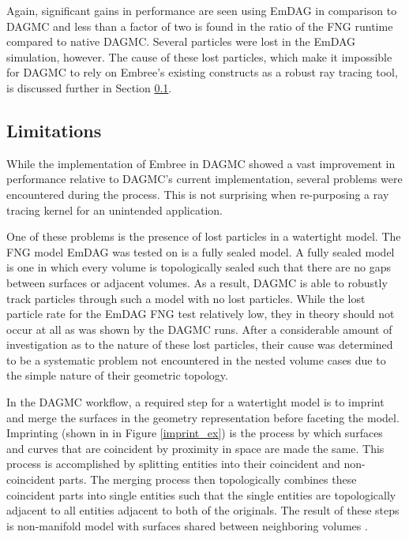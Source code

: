Again, significant gains in performance are seen using EmDAG in comparison to
DAGMC and less than a factor of two is found in the ratio of the FNG runtime
compared to native DAGMC. Several particles were lost in the EmDAG simulation,
however. The cause of these lost particles, which make it impossible for DAGMC
to rely on Embree's existing constructs as a robust ray tracing tool, is
discussed further in Section \ref{sec:emdag_limitations}.

\subsection{Limitations}\label{sec:emdag_limitations}

While the implementation of Embree in DAGMC showed a vast improvement in
performance relative to DAGMC's current implementation, several problems were
encountered during the process. This is not surprising when re-purposing a ray
tracing kernel for an unintended application.

One of these problems is the presence of lost particles in a watertight
model. The FNG model EmDAG was tested on is a fully sealed model. A fully sealed
model is one in which every volume is topologically sealed such that there are
no gaps between surfaces or adjacent volumes. As a result, DAGMC is able to
robustly track particles through such a model with no lost particles. While the
lost particle rate for the EmDAG FNG test relatively low, they in theory should
not occur at all as was shown by the DAGMC runs. After a considerable amount of
investigation as to the nature of these lost particles, their cause was
determined to be a systematic problem not encountered in the nested volume cases
due to the simple nature of their geometric topology.

In the DAGMC workflow, a required step for a watertight model is to imprint and
merge the surfaces in the geometry representation before faceting the
model. Imprinting (shown in in Figure \ref{imprint_ex}) is the process by which
surfaces and curves that are coincident by proximity in space are made the
same. This process is accomplished by splitting entities into their coincident
and non-coincident parts. The merging process then topologically combines these
coincident parts into single entities such that the single entities are
topologically adjacent to all entities adjacent to both of the originals. The
result of these steps is non-manifold model with surfaces shared between
neighboring volumes \cite{Smith_2011}.

